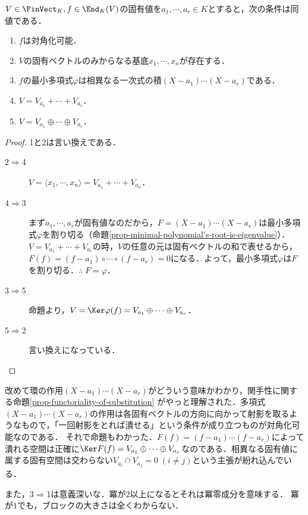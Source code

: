 \documentclass[uplatex, dvipdfmx]{jsreport}
\begin{document}
\begin{corollary}[対角化可能条件]\label{cor-diagonalizability}
    $V\in\FinVect_K,f\in\End_K(V)$の固有値を$a_1,\cdots,a_r\in K$とすると，次の条件は同値である．
    \begin{enumerate}
        \item $f$は対角化可能．
        \item $V$の固有ベクトルのみからなる基底$x_1,\cdots,x_n$が存在する．
        \item $f$の最小多項式$\varphi$は相異なる一次式の積$(X-a_1)\cdots(X-a_r)$である．
        \item $V=V_{a_1}+\cdots+V_{a_r}$．
        \item $V=V_{a_1}\oplus\cdots\oplus V_{a_r}$．
    \end{enumerate}
\end{corollary}
\begin{proof}
    1と2は言い換えである．
    \begin{description}
        \item[2$\Rightarrow$4] $V=\langle x_1,\cdots,x_n\rangle=V_{a_1}+\cdots+V_{a_n}$．
        \item[4$\Rightarrow$3] まず$a_1,\cdots,a_r$が固有値なのだから，$F=(X-a_1)\cdots(X-a_r)$は最小多項式$\varphi$を割り切る（命題\ref{prop-minimal-polynomial's-root-is-eigenvalue}）．$V=V_{a_1}+\cdots+V_{a_r}$の時，$V$の任意の元は固有ベクトルの和で表せるから，$F(f)=(f-a_1)\circ\cdots\circ(f-a_r)=0$になる．よって，最小多項式$\varphi$は$F$を割り切る．$\therefore\;F=\varphi$．
        \item[3$\Rightarrow$5] 命題より，$V=\Ker\varphi(f)=V_{a_1}\oplus\cdots\oplus V_{a_r}$．
        \item[5$\Rightarrow$2] 言い換えになっている．
    \end{description}
\end{proof}
\begin{remark}
    改めて環の作用$(X-a_1)\cdots(X-a_r)$がどういう意味かわかり，関手性に関する命題\ref{prop-functoriality-of-substitution}
    がやっと理解された．多項式$(X-a_1)\cdots(X-a_r)$の作用は各固有ベクトルの方向に向かって射影を取るようなもので，「一回射影をとれば潰せる」という条件が成り立つものが対角化可能なのである．
    それで命題もわかった．$F(f)=(f-a_1)\cdots(f-a_r)$によって潰れる空間は正確に$\Ker F(f)=V_{a_1}\oplus\cdots\oplus V_{a_r}$なのである．相異なる固有値に属する固有空間は交わらない$V_{a_i}\cap V_{a_j}=0\;(i\ne j)$という主張が紛れ込んでいる．

    また，3$\Rightarrow$1は意義深いな．冪が$2$以上になるとそれは冪零成分を意味する．
    冪が$1$でも，ブロックの大きさは全くわからない．
\end{remark}
\end{document}
